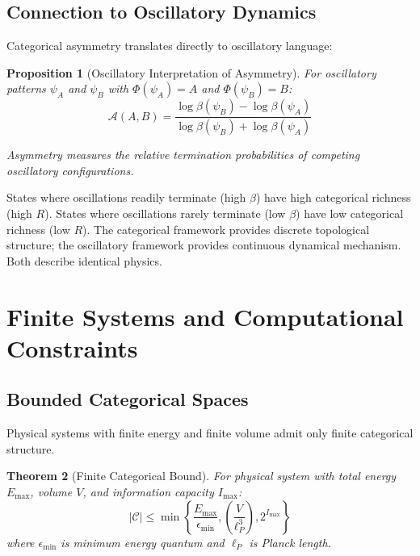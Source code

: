 \documentclass[11pt]{article}
\newtheorem{theorem}{Theorem}[section]
\newtheorem{proposition}[theorem]{Proposition}
\theoremstyle{remark}
\begin{document}
\subsection{Connection to Oscillatory Dynamics}

Categorical asymmetry translates directly to oscillatory language:

\begin{proposition}[Oscillatory Interpretation of Asymmetry]
\label{prop:oscillatory_asymmetry}
For oscillatory patterns $\psi_A$ and $\psi_B$ with $\Phi(\psi_A) = A$ and $\Phi(\psi_B) = B$:
\begin{equation}
\mathcal{A}(A, B) = \frac{\log \beta(\psi_B) - \log \beta(\psi_A)}{\log \beta(\psi_B) + \log \beta(\psi_A)}
\end{equation}

Asymmetry measures the relative termination probabilities of competing oscillatory configurations.
\end{proposition}

States where oscillations readily terminate (high $\beta$) have high categorical richness (high $R$). States where oscillations rarely terminate (low $\beta$) have low categorical richness (low $R$). The categorical framework provides discrete topological structure; the oscillatory framework provides continuous dynamical mechanism. Both describe identical physics.

\section{Finite Systems and Computational Constraints}

\subsection{Bounded Categorical Spaces}

Physical systems with finite energy and finite volume admit only finite categorical structure.

\begin{theorem}[Finite Categorical Bound]
\label{thm:finite_categorical}
For physical system with total energy $E_{\text{max}}$, volume $V$, and information capacity $I_{\text{max}}$:
\begin{equation}
|\mathcal{C}| \leq \min\left\{ \frac{E_{\text{max}}}{\epsilon_{\text{min}}}, \left(\frac{V}{\ell_P^3}\right), 2^{I_{\text{max}}} \right\}
\end{equation}
where $\epsilon_{\text{min}}$ is minimum energy quantum and $\ell_P$ is Planck length.
\end{theorem}
\end{document}

